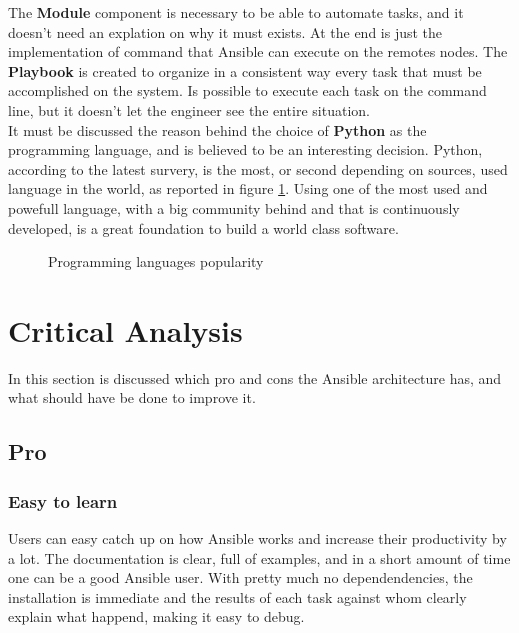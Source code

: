 \documentclass[conference]{IEEEtran}
\begin{document}
The \textbf{Module} component is necessary to be able to automate tasks, and it doesn't need an explation on why it must exists. At the end is just the implementation of command that Ansible can execute on the remotes nodes. The \textbf{Playbook} is created to organize in a consistent way every task that must be accomplished on the system. Is possible to execute each task on the command line, but it doesn't let the engineer see the entire situation.\\
It must be discussed the reason behind the choice of \textbf{Python} as the programming language, and is believed to be an interesting decision. Python, according to the latest survery, is the most, or second depending on sources, used language in the world, as reported in figure \ref{lang}.
Using one of the most used and powefull language, with a big community behind and that is continuously developed, is a great foundation to build a world class software.\\

\begin{figure}
  \caption{Programming languages popularity}
  \label{lang}
\end{figure}

\section{Critical Analysis}
\label{analysis}
In this section is discussed which pro and cons the Ansible architecture has, and what should have be done to improve it.
\subsection{Pro}
\subsubsection{Easy to learn}
Users can easy catch up on how Ansible works and increase their productivity by a lot. The documentation is clear, full of examples, and in a short amount of time one can be a good Ansible user. With pretty much no dependendencies, the installation is immediate and the results of each task against whom clearly explain what happend, making it easy to debug.
\end{document}
